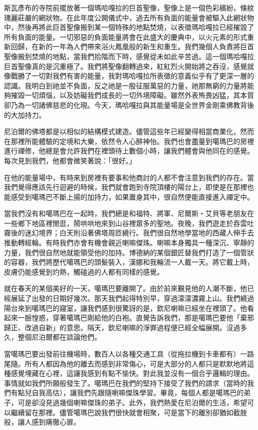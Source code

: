 斯瓦彥布的寺院前擺放著一個瑪哈嘎拉的巨首聖像，聖像上是一個色彩繽紛，條紋瑰麗莊嚴的網狀物。在此年度公開儀式中，過去所有負面的能量會被驅入此網狀物中，然後再將此巨首聖像搬到某一個特殊的地點焚燒，以表徵瑪哈嘎拉已經摧毀了所有負面的能量。一切邪惡的負面能量將會在此盛大的慶典中，以火元素的形式重新回歸，在新的一年為人們帶來浴火鳳凰般的新生和重生。我們幾個人負責將巨首聖像搬到焚燒的地點，當我們拾階而下時，感覺從未如此辛苦過。這一個瑪哈嘎拉巨首聖像真的是沉重極了。我們將聖像翻轉過來，紅紅烈火開始將之吞沒，感覺就像戰勝了一切對我們有害的能量，我對瑪哈嘎拉所表徵的意義似乎有了更深一層的認識。我明白到祂並不負面，反之祂是一股征服萬惡的力量，祂那無窮的力量將能夠摧毀一切煩惱，以及妨礙我們成長的一切外境障礙。雖然外表怖畏凶猛，其本質卻乃為一切諸佛慈悲的化現。今天，瑪哈嘎拉與其能量場是全世界金剛乘佛教背後的大加持力。

尼泊爾的佛塔都是以相似的結構模式建造。儘管這些年已經變得相當商業化，然而在那裡所能體驗的定境和大樂，依然令人心醉神怡。我們也會盡量到噶瑪巴的房裡進行禪修，他總是會允許我們在裡頭待上數個小時，讓我們體會與他同在的感覺。每次見到我們，他都會微笑著說：「很好。」

在他的能量場中，有時來到房裡有要事和他商討的人都不會注意到我們的存在。當我們覺得應該先行迴避的時候，我們就會跑到寺院頂樓的陽台上，即使是在那裡也能感受到噶瑪巴不斷上揚的加持力，如果置身其中，很自然便能直接進入禪定中。

當我們沒有和噶瑪巴在一起時，我們總是和福特、將軍、尼爾斯‧艾貝等老朋友在一些鄉下地區裡閒逛，鬧哄哄地來到山谷裡眾多的聖地。夜晚，我們遊走於吞雲吐霧後的迷幻境界；白天則沿著佛塔周匝繞行。我們很自然地學當地的西藏人伸手去推動轉經輪。有時我們亦會有機會親近喇嘛傑珠。喇嘛本身獨具一種深沉、寧靜的力量，我們很自然地就能領受他的加持。博德納的某個銀匠替我們打造了一個管狀的容器，我們將歷代噶瑪巴的頭髮裝入，漢娜和我輪流一人戴一天。將它戴上時，皮膚仍能感覺到灼熱，觸碰過的人都有同樣的感覺。

就在春天的某個美好的一天，噶瑪巴要離開了。由於前來覲見他的人潮不斷，他已經展延了出發的日期好幾次。那天我們起得特別早，穿過濛濛濃霧上山。我們繞過陽台來到噶瑪巴的寢室，讓我們感到很驚訝的是，欽尼喇嘛已經坐在裡頭了。他看起來一臉惶惑，穿著噶瑪巴剛給他的白袍。直覺告訴我們，那是噶瑪巴要他「棄邪歸正、改過自新」的意思。隔天，欽尼喇嘛的淨罪過程便已經全幅展開。沒過多久，整個尼泊爾都在談論他們。

當噶瑪巴要出發前往機場時，數百人以各種交通工具（從拖拉機到卡車都有）一路尾隨。所有人都因為他的離去而感到非常傷心，可是大部分的人都只是默默地將這種感覺埋藏在心裡，這讓我感到有點不愉快。對此我並沒有一個合乎邏輯的理由。事情就如我們所願般發生了。噶瑪巴在我們的堅持下接受了我們的請求（當時的我們有點兒自我高估），讓我們先跟隨喇嘛傑珠學習。畢竟，每個人都是噶瑪巴的弟子，可是卻沒見過幾個喇嘛傑珠的弟子。此外，我們熱愛在尼泊爾的生活，希望可以繼續留在那裡。儘管噶瑪巴說我們很快就會相聚，可是當下的離別卻猶如截肢般，讓人感到痛徹心扉。

